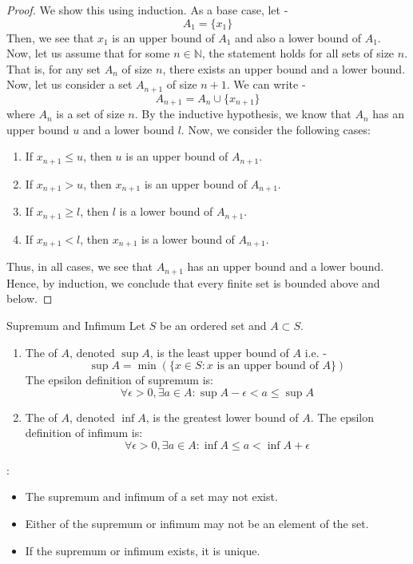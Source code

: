 \documentclass[openany]{book}
\begin{document}
\begin{proof}
We show this using induction. As a base case, let - 
$$A_1 = \{x_1\}$$
Then, we see that $x_1$ is an upper bound of $A_1$ and also a lower bound of $A_1$. Now, let us assume that for some $n \in \mathbb{N}$, the statement holds for all sets of size $n$. That is, for any set $A_n$ of size $n$, there exists an upper bound and a lower bound. Now, let us consider a set $A_{n+1}$ of size $n+1$. We can write -
$$A_{n+1} = A_n \cup \{x_{n+1}\}$$
where $A_n$ is a set of size $n$. By the inductive hypothesis, we know that $A_n$ has an upper bound $u$ and a lower bound $l$. Now, we consider the following cases: 
\begin{enumerate}
    \item If $x_{n+1} \leq u$, then $u$ is an upper bound of $A_{n+1}$.
    \item If $x_{n+1} > u$, then $x_{n+1}$ is an upper bound of $A_{n+1}$.
    \item If $x_{n+1} \geq l$, then $l$ is a lower bound of $A_{n+1}$.
    \item If $x_{n+1} < l$, then $x_{n+1}$ is a lower bound of $A_{n+1}$.
\end{enumerate}
Thus, in all cases, we see that $A_{n+1}$ has an upper bound and a lower bound. Hence, by induction, we conclude that every finite set is bounded above and below. 
\end{proof}
\begin{mydefinition}{Supremum and Infimum}
    Let $S$ be an ordered set and $A \subset S$.
    \begin{enumerate}
        \item The  of $A$, denoted $\sup A$, is the least upper bound of $A$ i.e. - 
        $$\sup A = \min ( \{x \in S : x \text{ is an upper bound of } A \} )$$
        The epsilon definition of supremum is:
        $$\forall \epsilon > 0, \exists a \in A: \sup A - \epsilon < a \leq \sup A$$
        \item The  of $A$, denoted $\inf A$, is the greatest lower bound of $A$.
        The epsilon definition of infimum is:
        $$\forall \epsilon > 0, \exists a \in A: \inf A \leq a < \inf A + \epsilon$$
    \end{enumerate}
\end{mydefinition}
\begin{mynote}
: 
\begin{itemize}
    \item The supremum and infimum of a set may not exist. 
    \item Either of the supremum or infimum may not be an element of the set.
    \item If the supremum or infimum exists, it is unique.
\end{itemize}
\end{mynote}
\end{document}
